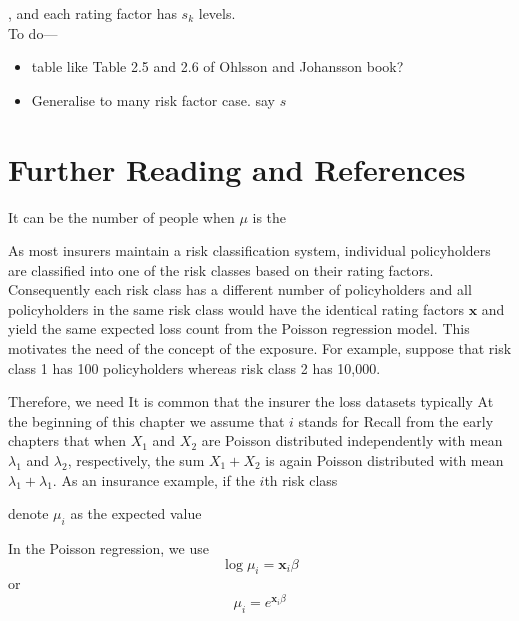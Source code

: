 \documentclass[12pt]{article}
\begin{document}
, and each rating factor has $s_k$ levels. 
\\

To do---
\begin{itemize}
  \item table like Table 2.5 and 2.6 of Ohlsson and Johansson book?
  \item Generalise to many risk factor case. say $s$
\end{itemize}
\section{Further Reading and References}


 It can be the number of people when $\mu$ is the 

As most insurers maintain a risk classification system, individual policyholders are classified into one of the risk classes based on their rating factors. Consequently each risk class has a different number of policyholders and all policyholders in the same risk class would have the identical rating factors $\mathbf{ x}$ and yield the same expected loss count from the Poisson regression model. This motivates the need of the concept of the exposure. For example, suppose that risk class 1 has 100 policyholders whereas risk class 2 has 10,000. 

Therefore, we need It is common that the insurer
the loss datasets typically 
At the beginning of this chapter we assume that $i$ stands for 
Recall from the early chapters that when $X_1$ and $X_2$ are Poisson distributed independently with mean $\lambda_1$ and $\lambda_2$, respectively, the sum $X_1+X_2$ is again Poisson distributed with mean $\lambda_1+\lambda_1$. As an insurance example, if the $i$th risk class






denote $\mu_i$ as the expected value 

In the Poisson regression, we use
\begin{equation}
\label{ }
\log \mu_i=\mathbf{ x}_i\beta
\end{equation}
or 
\begin{equation}
\label{ }
\mu_i=e^{\mathbf{ x}_i\beta}
\end{equation}
\end{document}
